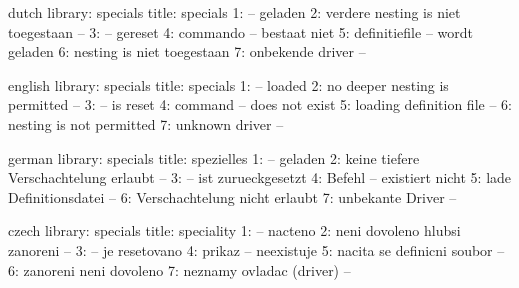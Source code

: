 

\newif\ifsimplifyspecials \simplifyspecialstrue %


\ifx\realpageno\undefined
  \countdef{} 
\fi



\unprotect

\startmessages  dutch  library: specials
  title: specials
      1: -- geladen
      2: verdere nesting is niet toegestaan --
      3: -- gereset
      4: commando -- bestaat niet
      5: definitiefile -- wordt geladen
      6: nesting is niet toegestaan
      7: onbekende driver --
\stopmessages

\startmessages  english  library: specials
  title: specials
      1: -- loaded
      2: no deeper nesting is permitted --
      3: -- is reset
      4: command -- does not exist
      5: loading definition file --
      6: nesting is not permitted
      7: unknown driver --
\stopmessages

\startmessages  german  library: specials
  title: spezielles
      1: -- geladen
      2: keine tiefere Verschachtelung erlaubt --
      3: -- ist zurueckgesetzt
      4: Befehl -- existiert nicht
      5: lade Definitionsdatei --
      6: Verschachtelung nicht erlaubt
      7: unbekante Driver --
\stopmessages

\startmessages  czech  library: specials
  title: speciality
      1: -- nacteno
      2: neni dovoleno hlubsi zanoreni --
      3: -- je resetovano
      4: prikaz -- neexistuje
      5: nacita se definicni soubor --
      6: zanoreni neni dovoleno
      7: neznamy ovladac (driver) --
\stopmessages

